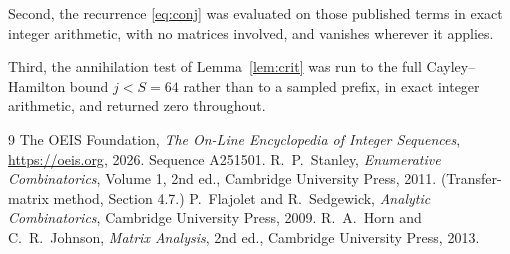 \documentclass[11pt,a4paper]{article}
\theoremstyle{plain}
\theoremstyle{definition}
\begin{document}
Second, the recurrence \eqref{eq:conj} was evaluated on those published terms in exact
integer arithmetic, with no matrices involved, and vanishes wherever it applies.

Third, the annihilation test of Lemma~\ref{lem:crit} was run to the full Cayley--Hamilton
bound $j<S=64$ rather than to a sampled prefix, in exact integer arithmetic, and returned
zero throughout.

\begin{thebibliography}{9}
 The OEIS Foundation, \emph{The On-Line Encyclopedia of Integer
Sequences}, \url{https://oeis.org}, 2026. Sequence A251501.
 R.~P.~Stanley, \emph{Enumerative Combinatorics}, Volume 1, 2nd ed.,
Cambridge University Press, 2011. (Transfer-matrix method, Section 4.7.)
 P.~Flajolet and R.~Sedgewick, \emph{Analytic Combinatorics}, Cambridge
University Press, 2009.
 R.~A.~Horn and C.~R.~Johnson, \emph{Matrix Analysis}, 2nd ed., Cambridge
University Press, 2013.
\end{thebibliography}
\end{document}
